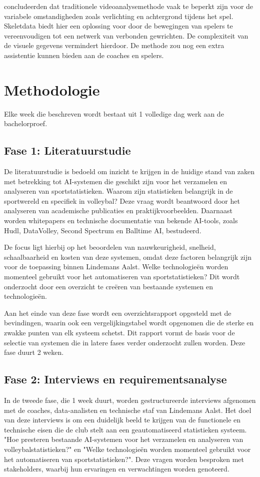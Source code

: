 \textcite{Liang2023} concludeerden dat traditionele videoanalysemethode vaak te beperkt zijn voor de variabele omstandigheden zoals verlichting en achtergrond tijdens het spel. Skeletdata biedt hier een oplossing voor door de bewegingen van spelers te vereenvoudigen tot een netwerk van verbonden gewrichten. De complexiteit van de visuele gegevens vermindert hierdoor. De methode zou nog een extra assistentie kunnen bieden aan de coaches en spelers.
\section{Methodologie}%
\label{sec:methodologie}

Elke week die beschreven wordt bestaat uit 1 volledige dag werk aan de bachelorproef.
\subsection{Fase 1: Literatuurstudie}
De literatuurstudie is bedoeld om inzicht te krijgen in de huidige stand van zaken met betrekking tot AI-systemen die geschikt zijn voor het verzamelen en analyseren van sportstatistieken. Waarom zijn statistieken belangrijk in de sportwereld en specifiek in volleybal? Deze vraag wordt beantwoord door het analyseren van academische publicaties en praktijkvoorbeelden. Daarnaast worden whitepapers en technische documentatie van bekende AI-tools, zoals Hudl, DataVolley, Second Spectrum en Balltime AI, bestudeerd.

De focus ligt hierbij op het beoordelen van nauwkeurigheid, snelheid, schaalbaarheid en kosten van deze systemen, omdat deze factoren belangrijk zijn voor de toepassing binnen Lindemans Aalst. Welke technologieën worden momenteel gebruikt voor het automatiseren van sportstatistieken? Dit wordt onderzocht door een overzicht te creëren van bestaande systemen en technologieën.

Aan het einde van deze fase wordt een overzichtsrapport opgesteld met de bevindingen, waarin ook een vergelijkingstabel wordt opgenomen die de sterke en zwakke punten van elk systeem schetst. Dit rapport vormt de basis voor de selectie van systemen die in latere fases verder onderzocht zullen worden. Deze fase duurt 2 weken.
\subsection{Fase 2: Interviews en requirementsanalyse}
In de tweede fase, die 1 week duurt, worden gestructureerde interviews afgenomen met de coaches, data-analisten en technische staf van Lindemans Aalst. Het doel van deze interviews is om een duidelijk beeld te krijgen van de functionele en technische eisen die de club stelt aan een geautomatiseerd statistieken systeem. "Hoe presteren bestaande AI-systemen voor het verzamelen en analyseren van volleybalstatistieken?" en "Welke technologieën worden momenteel gebruikt voor het automatiseren van sportstatistieken?". Deze vragen worden besproken met stakeholders, waarbij hun ervaringen en verwachtingen worden genoteerd.


